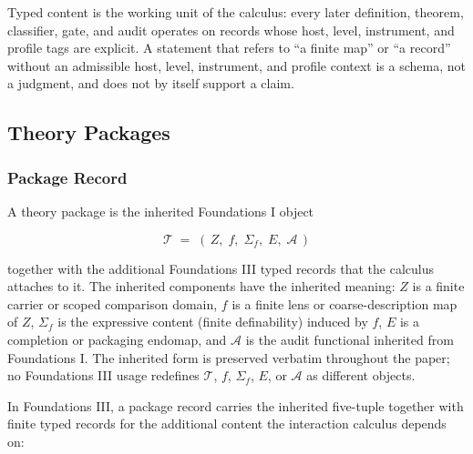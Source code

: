 \documentclass[11pt]{article}
\theoremstyle{definition}
\begin{document}
Typed content is the working unit of the calculus: every later definition, theorem, classifier, gate, and audit operates on records whose host, level, instrument, and profile tags are explicit. A statement that refers to ``a finite map'' or ``a record'' without an admissible host, level, instrument, and profile context is a schema, not a judgment, and does not by itself support a claim.

\subsection{Theory Packages}

\subsubsection{Package Record}

A theory package is the inherited Foundations I object

\[
\mathcal T \;=\; (\,Z,\;f,\;\Sigma_f,\;E,\;\mathcal A\,)
\]

together with the additional Foundations III typed records that the calculus attaches to it. The inherited components have the inherited meaning: \(Z\) is a finite carrier or scoped comparison domain, \(f\) is a finite lens or coarse-description map of \(Z\), \(\Sigma_f\) is the expressive content (finite definability) induced by \(f\), \(E\) is a completion or packaging endomap, and \(\mathcal A\) is the audit functional inherited from Foundations I. The inherited form is preserved verbatim throughout the paper; no Foundations III usage redefines \(\mathcal T\), \(f\), \(\Sigma_f\), \(E\), or \(\mathcal A\) as different objects.

In Foundations III, a package record carries the inherited five-tuple together with finite typed records for the additional content the interaction calculus depends on:
\end{document}

